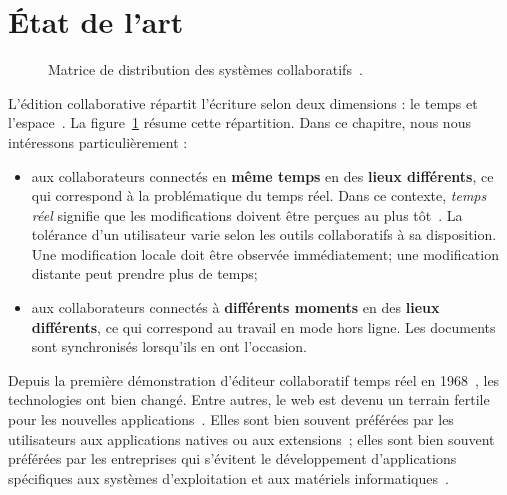 
\section{État de l'art}
\label{editor:sec:stateoftheart}

\begin{figure}
  \begin{center}
    
    \caption[Matrice de distribution des systèmes collaboratifs] {
      \label{editor:fig:groupware} Matrice de distribution des systèmes
      collaboratifs~\cite{johansen1988groupware}.}
  \end{center}
\end{figure}


L'édition collaborative répartit l'écriture selon deux dimensions : le temps et
l'espace~\cite{desanctis1987foundation, grudin1994computersupported,
  johansen1988groupware}.  La figure~\ref{editor:fig:groupware} résume cette
répartition. Dans ce chapitre, nous nous intéressons particulièrement :
\begin{itemize}
\item aux collaborateurs connectés en \textbf{même temps} en des \textbf{lieux
    différents}, ce qui correspond à la problématique du temps réel. Dans ce
  contexte, \emph{temps réel} signifie que les modifications doivent être
  perçues au plus tôt~\cite{ellis1989concurrency}. La tolérance d'un utilisateur
  varie selon les outils collaboratifs à sa disposition. Une modification locale
  doit être observée immédiatement; une modification distante peut prendre plus
  de temps;
\item aux collaborateurs connectés à \textbf{différents moments} en des
  \textbf{lieux différents}, ce qui correspond au travail en mode hors
  ligne. Les documents sont synchronisés lorsqu'ils en ont l'occasion.
\end{itemize}

Depuis la première démonstration d'éditeur collaboratif temps réel en
1968~\cite{engelbart1968research}, les technologies ont bien changé. Entre
autres, le web est devenu un terrain fertile pour les nouvelles
applications~\cite{lautamaki2013development}. Elles sont bien souvent préférées
par les utilisateurs aux applications natives ou aux
extensions~\cite{mogan2010impact}; elles sont bien souvent préférées par les
entreprises qui s'évitent le développement d'applications spécifiques aux
systèmes d'exploitation et aux matériels informatiques~\cite{mogan2010impact}.


